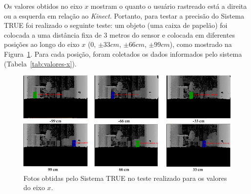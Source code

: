 	Os valores obtidos no eixo $\displaystyle x$ mostram o quanto o usuário
	rastreado está a direita ou a esquerda em relação ao \textit{Kinect}. Portanto,
	para testar a precisão do Sistema TRUE foi realizado o seguinte teste: um objeto
	(uma caixa de papelão) foi colocada a uma distância fixa de 3 metros do sensor e
	colocada em diferentes posições ao longo do eixo $\displaystyle x$ (0,
	$\displaystyle \pm33 cm$, $\displaystyle \pm66 cm$, $\displaystyle \pm99 cm$),
	como mostrado na Figura~\ref{fig:eixox-imgs}. Para cada posição, foram coletados
	os dados informados pelo sistema (Tabela~\ref{tab:valores-x}).


	\begin{figure}[htb]
		\begin{center}
			\includegraphics[scale=0.45]{figuras/5.Testes/eixox-imgs2.png}
		\end{center}
		\caption{Fotos obtidas pelo Sistema TRUE no teste realizado para os valores do eixo $\displaystyle x$.}
		\label{fig:eixox-imgs}
	\end{figure}

